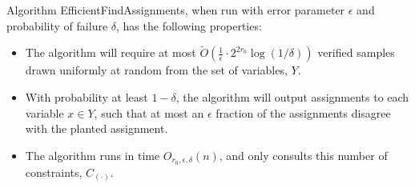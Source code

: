 \documentclass[final,12pt]{colt2018}
\newcommand{\eps}{\epsilon}
\begin{document}
\begin{proposition}
Algorithm EfficientFindAssignments, when run with error parameter $\eps$ and probability of failure $\delta$, has the following properties:
\begin{itemize}
\item The algorithm will require at most $\tilde{O}\left(\frac{1}{\eps} \cdot 2^{2 r_0} \log(1/\delta)\right)$ verified samples drawn uniformly at random from the set of variables, $Y$.
\item With probability at least $1-\delta$, the algorithm will output assignments to each variable $x \in Y$, such that at most an $\eps$ fraction of the assignments disagree with the planted assignment.
\item  The algorithm runs in time $O_{r_0,\eps,\delta}(n)$, and only consults this number of constraints, $C_{(\cdot)}$.
\end{itemize}\end{proposition}
\end{document}
